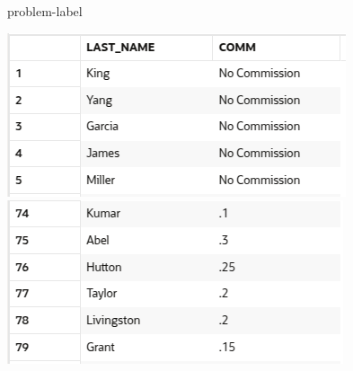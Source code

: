 \begin{problem}{}{problem-label}
\begin{center}
  \includegraphics[scale=0.8]{images/c4a4-1.png}
  \includegraphics[scale=0.8]{images/c4a4-2.png}
\end{center}

\end{problem}


